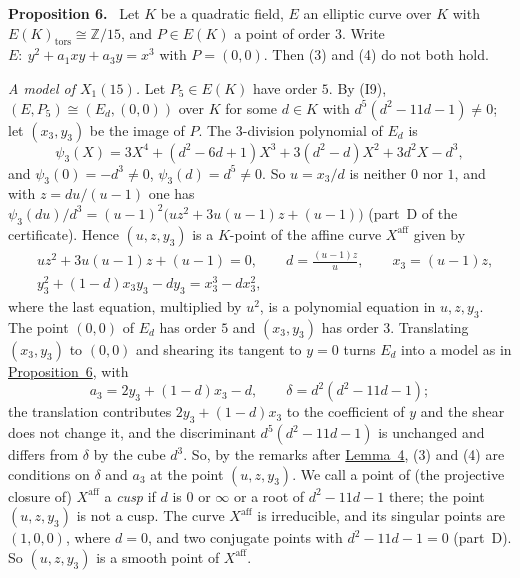 \documentclass[11pt]{article}
\newenvironment{statement}[1]{\par\medskip\noindent\phantomsection\textbf{#1}\ }{\par\medskip}
\newcommand{\Z}{\mathbb Z}
\begin{document}
\begin{statement}{Proposition 6.}\label{prop-families}
Let \(K\) be a quadratic field, \(E\) an elliptic curve over \(K\) with
\(E(K)_{\mathrm{tors}}\cong\Z/15\), and \(P\in E(K)\) a point of order \(3\). Write
\(E:\ y^2+a_1xy+a_3y=x^3\) with \(P=(0,0)\). Then (3) and (4) do not both hold.
\end{statement}

\emph{A model of \(X_1(15)\).} Let \(P_5\in E(K)\) have order \(5\). By (I9),
\((E,P_5)\cong(E_d,(0,0))\) over \(K\) for some \(d\in K\) with \(d^5(d^2-11d-1)\neq0\); let
\((x_3,y_3)\) be the image of \(P\). The \(3\)-division polynomial of \(E_d\) is
\[\psi_3(X)=3X^4+(d^2-6d+1)X^3+3(d^2-d)X^2+3d^2X-d^3,\]
and \(\psi_3(0)=-d^3\neq0\), \(\psi_3(d)=d^5\neq0\). So \(u=x_3/d\) is neither \(0\) nor \(1\), and with
\(z=du/(u-1)\) one has \(\psi_3(du)/d^3=(u-1)^2\bigl(uz^2+3u(u-1)z+(u-1)\bigr)\) (part~D of the
certificate). Hence \((u,z,y_3)\) is a \(K\)-point of the affine curve \(X^{\mathrm{aff}}\) given by
\[\begin{aligned}
&uz^2+3u(u-1)z+(u-1)=0,\qquad d=\frac{(u-1)z}{u},\qquad x_3=(u-1)z,\\
&y_3^2+(1-d)x_3y_3-dy_3=x_3^3-dx_3^2,
\end{aligned}\tag{10}\]
where the last equation, multiplied by \(u^2\), is a polynomial equation in \(u,z,y_3\). The point
\((0,0)\) of \(E_d\) has order \(5\) and \((x_3,y_3)\) has order \(3\). Translating \((x_3,y_3)\) to
\((0,0)\) and shearing its tangent to \(y=0\) turns \(E_d\) into a model as in
\hyperref[prop-families]{Proposition~6}, with
\[a_3=2y_3+(1-d)x_3-d,\qquad \delta=d^2(d^2-11d-1);\tag{11}\]
the translation contributes \(2y_3+(1-d)x_3\) to the coefficient of \(y\) and the shear does not change
it, and the discriminant \(d^5(d^2-11d-1)\) is unchanged and differs from \(\delta\) by the cube
\(d^3\). So, by the remarks after \hyperref[lemma-conditions]{Lemma~4}, (3) and (4) are conditions on
\(\delta\) and \(a_3\) at the point \((u,z,y_3)\). We call a point of (the projective closure of)
\(X^{\mathrm{aff}}\) a \emph{cusp} if \(d\) is \(0\) or \(\infty\) or a root of \(d^2-11d-1\) there;
the point \((u,z,y_3)\) is not a cusp. The curve \(X^{\mathrm{aff}}\) is irreducible, and its singular
points are \((1,0,0)\), where \(d=0\), and two conjugate points with \(d^2-11d-1=0\) (part~D). So \((u,z,y_3)\) is a smooth point of \(X^{\mathrm{aff}}\).
\end{document}
